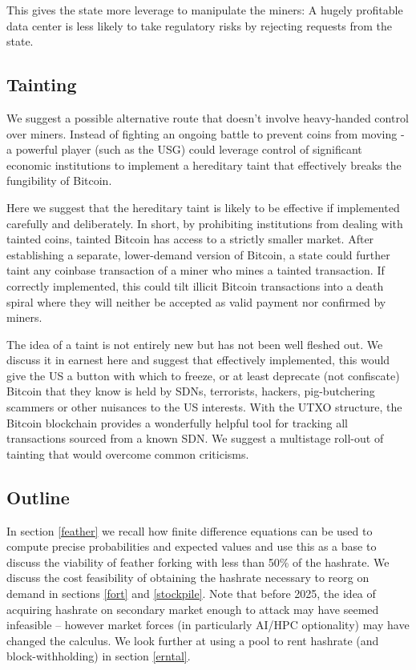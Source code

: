 \documentclass{article}%
\begin{document}
This gives the state more leverage to manipulate the miners: A hugely
profitable data center is less likely to take regulatory risks by rejecting requests from
the state.

\subsection{Tainting}

We suggest a possible alternative route that doesn't involve heavy-handed
control over miners.  Instead of fighting an ongoing battle to prevent coins
from moving - a powerful player (such as the USG) could leverage control of
significant economic institutions to implement a hereditary taint that
effectively breaks the fungibility of Bitcoin.

Here we suggest that the hereditary taint is likely to be effective if
implemented carefully and deliberately.  In short, by prohibiting
institutions from dealing with tainted coins, tainted Bitcoin has access to a
strictly smaller market.  After establishing a separate, lower-demand version
of Bitcoin, a state could further taint any coinbase transaction of a miner
who mines a tainted transaction. If correctly implemented, this could tilt illicit
Bitcoin transactions into a death spiral where they will neither be accepted
as valid payment nor confirmed by miners.

The idea of a taint is not entirely new but has not been well fleshed out.
 We discuss it in earnest here and suggest that effectively implemented, this
would give the US a button with which to freeze, or at least deprecate (not
confiscate) Bitcoin that they know is held by SDNs, terrorists, hackers,
pig-butchering scammers or other nuisances to the US interests.  With the
UTXO structure, the Bitcoin blockchain provides a wonderfully helpful tool
for tracking all transactions sourced from a known SDN.  We suggest a multistage roll-out of tainting that would overcome common criticisms.

\subsection{Outline}

In section \ref{feather} we recall how finite difference equations can be used
to compute precise probabilities and expected values and use this as
a base to discuss the viability of feather forking with less than 50\% of the
hashrate.  We discuss the cost feasibility of obtaining the hashrate
necessary to reorg on demand in sections \ref{fort} and  \ref{stockpile}.
 Note that before 2025, the idea of acquiring hashrate on secondary market
enough to attack may have seemed infeasible -- however market forces (in
particularly AI/HPC optionality) may have changed the calculus.  We look
further at using a pool to rent hashrate (and block-withholding) in section
\ref{erntal}.
\end{document}
